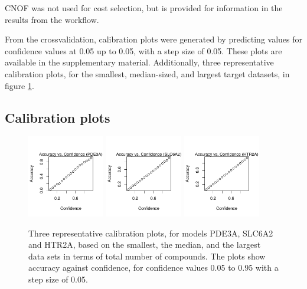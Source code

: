 \documentclass[10pt,article]{memoir}
\begin{document}


CNOF was not used for cost selection, but is provided for information in the results from the workflow.

From the crossvalidation, calibration plots were generated by predicting values
for confidence values at 0.05 up to 0.05, with a step size of 0.05. These plots
are available in the supplementary material. Additionally, three representative
calibration plots, for the smallest, median-sized, and largest target datasets,
in figure \ref{fig:calibration_plots}.

\subsection{Calibration plots}

\begin{figure}[h!]
\includegraphics[width=0.3\textwidth]{figures/calibration_plots/pde3a_calib.pdf}
\includegraphics[width=0.3\textwidth]{figures/calibration_plots/slc6a2_calib.pdf}
\includegraphics[width=0.3\textwidth]{figures/calibration_plots/htr2a_calib.pdf}
    \caption{Three representative calibration plots, for models PDE3A, SLC6A2
    and HTR2A, based on the smallest, the median, and the largest data sets in
    terms of total number of compounds. The plots show accuracy against
    confidence, for confidence values 0.05 to 0.95 with a step size of 0.05.}
    \label{fig:calibration_plots}
\end{figure}
\end{document}
